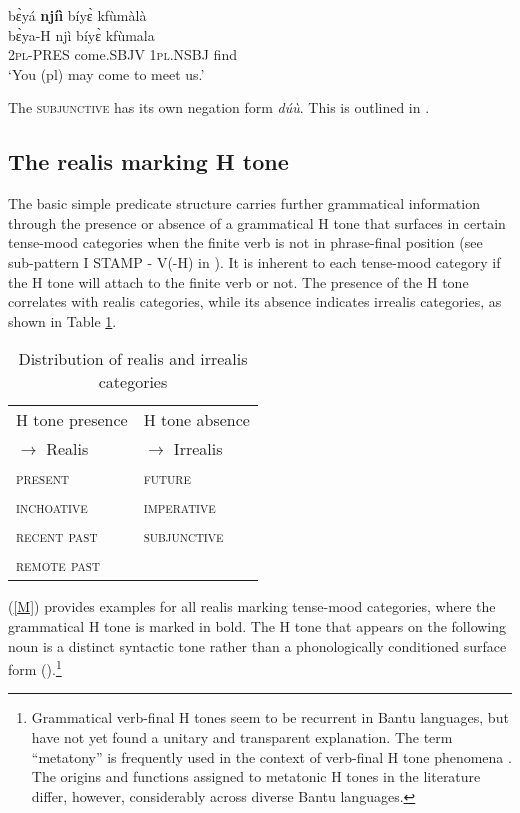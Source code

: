 \begin{exe} 
\ex\label{SBJVd}
  \glll  bɛ̀yá {\bfseries njíì} bíyɛ̀ kfùmàlà \\
         bɛ̀ya-H njì bíyɛ̀ kfùmala \\
         2\textsc{pl}-PRES  come.SBJV 1\textsc{pl}.NSBJ find  \\
    \trans `You (pl) may come to meet us.'
\end{exe}

The \textsc{subjunctive} has its own negation form {\itshape dúù}. This is outlined in .









\subsection{The realis marking H tone}
\label{sec:SynH}

The basic simple predicate structure carries further grammatical information through the presence or absence of a grammatical H tone that surfaces in certain tense-mood categories when the finite verb is not in phrase-final position (see sub-pattern I STAMP - V(-H) in ). It is inherent to each tense-mood category if the H tone will attach to the finite verb or not. The presence of the H tone correlates with realis categories, while its absence indicates irrealis categories, as shown in Table \ref{Tab:RIRRaxis}.


\begin{table}[!h]
\centering
\begin{tabular}{l|l}
H tone presence & H tone absence \\
$\rightarrow$ Realis & $\rightarrow$ Irrealis \\
 \midrule
\textsc{present} & \textsc{future} \\
\textsc{inchoative} & \textsc{imperative}  \\
\textsc{recent past}  & \textsc{subjunctive} \\
\textsc{remote past} &  \\
\end{tabular}
\caption{Distribution of realis and irrealis categories}
\label{Tab:RIRRaxis}
\end{table}

(\ref{M}) provides examples for all realis marking tense-mood categories, where the grammatical H tone is marked in bold. The H tone that appears on the following noun is a distinct syntactic tone rather than a phonologically conditioned surface form ().\footnote{Grammatical verb-final H tones seem to be recurrent in Bantu languages, but have not yet found a unitary and transparent explanation. The term ``metatony'' is frequently used in the context of verb-final H tone phenomena \citep{dimmendaal95, angenot71, hyman2011, schadeberg95, hadermann2005,costa2008, makasso2012, nurse08}. The origins and functions assigned to metatonic H tones in the literature differ, however, considerably across diverse Bantu languages.}


